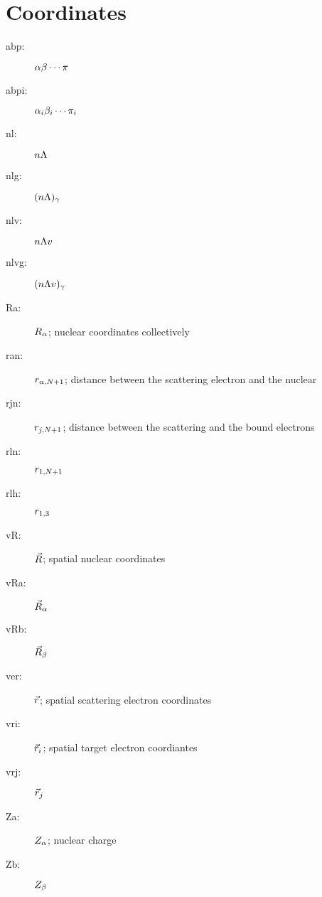 \documentclass{article}
\begin{document}
\section{Coordinates}
\label{sec:subscripts}
\begin{description}
\item[abp:] $\alpha\beta\cdots\pi$
\item[abpi:] ${\alpha_i\beta_i\cdots\pi_i}$
\item[nl:] $n\Lambda$
\item[nlg:] $(n\Lambda)_\gamma$
\item[nlv:] $n\Lambda v$
\item[nlvg:] $(n\Lambda v)_\gamma$
\item[Ra:] $R_\alpha$; nuclear coordinates collectively
\item[ran:] $r_{\alpha,N+1}$; distance between the scattering electron and the
  nuclear
\item[rjn:] $r_{j,N+1}$; distance between the scattering and the bound
  electrons
\item[rln:] $r_{1,N+1}$
\item[rlh:] $r_{1,3}$
\item[vR:] $\vec{R}$; spatial nuclear coordinates 
\item[vRa:] $\vec{R}_\alpha$
\item[vRb:] $\vec{R}_\beta$
\item[ver:] $\vec{r}$; spatial scattering electron coordinates
\item[vri:] $\vec{r}_{i}$; spatial target electron coordiantes
\item[vrj:] $\vec{r}_{j}$
\item[Za:] $Z_\alpha$; nuclear charge
\item[Zb:] $Z_\beta$
\end{description}
\end{document}
